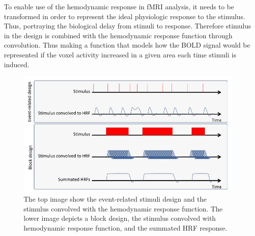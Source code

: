 To enable use of the hemodynamic response in fMRI analysis, it needs to be transformed in order to represent the ideal physiologic response to the stimulus. Thus, portraying the biological delay from stimuli to response. Therefore stimulus in the design is combined with the hemodynamic response function through convolution. Thus making a function that models how the BOLD signal would be represented if the voxel activity increased in a given area each time stimuli is induced. \cite{Moayedi2018}

\begin{figure}[H]                 
	\includegraphics[width=.8\textwidth]{figures/aBackground/event_vs_block}  
	\caption{The top image show the event-related stimuli design and the stimulus convolved with the hemodynamic response function. The lower image depicts a block design, the stimulus convolved with hemodynamic response function, and the summated HRF response.  \cite{Moayedi2018}}
	\label{fig:back:e_vs_b} 
\end{figure}

 

